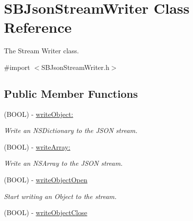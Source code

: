\hypertarget{interface_s_b_json_stream_writer}{
\section{SBJsonStreamWriter Class Reference}
\label{interface_s_b_json_stream_writer}
}


The Stream Writer class.  




{\ttfamily \#import $<$SBJsonStreamWriter.h$>$}

\subsection*{Public Member Functions}
\begin{DoxyCompactItemize}
\item 
\hypertarget{interface_s_b_json_stream_writer_a561990f7d890ffdafdc3f682cacc7211}{
(BOOL) -\/ \hyperlink{interface_s_b_json_stream_writer_a561990f7d890ffdafdc3f682cacc7211}{writeObject:}}
\label{interface_s_b_json_stream_writer_a561990f7d890ffdafdc3f682cacc7211}

\begin{DoxyCompactList}\small\item\em Write an NSDictionary to the JSON stream. \item\end{DoxyCompactList}\item 
\hypertarget{interface_s_b_json_stream_writer_a781a94592da7317105844dfc8c6706cc}{
(BOOL) -\/ \hyperlink{interface_s_b_json_stream_writer_a781a94592da7317105844dfc8c6706cc}{writeArray:}}
\label{interface_s_b_json_stream_writer_a781a94592da7317105844dfc8c6706cc}

\begin{DoxyCompactList}\small\item\em Write an NSArray to the JSON stream. \item\end{DoxyCompactList}\item 
\hypertarget{interface_s_b_json_stream_writer_ab9ff056f3f9f3ad5614163bcf194bbec}{
(BOOL) -\/ \hyperlink{interface_s_b_json_stream_writer_ab9ff056f3f9f3ad5614163bcf194bbec}{writeObjectOpen}}
\label{interface_s_b_json_stream_writer_ab9ff056f3f9f3ad5614163bcf194bbec}

\begin{DoxyCompactList}\small\item\em Start writing an Object to the stream. \item\end{DoxyCompactList}\item 
\hypertarget{interface_s_b_json_stream_writer_a5d5dae8a7c4c4bf8dd2780afa68cd251}{
(BOOL) -\/ \hyperlink{interface_s_b_json_stream_writer_a5d5dae8a7c4c4bf8dd2780afa68cd251}{writeObjectClose}}
\label{interface_s_b_json_stream_writer_a5d5dae8a7c4c4bf8dd2780afa68cd251}


\end{DoxyCompactItemize}
